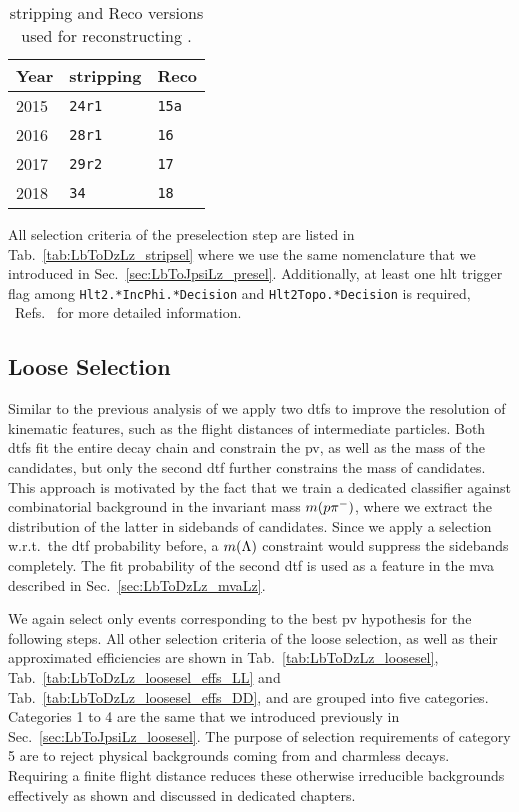\begin{table}[htbp]
    \centering
    \caption{\Gls{stripping} and Reco versions used for reconstructing \decay{\Lb}{\Dz\Lz}.}
    \label{tab:LbToDzLz_vstripping}

    \begin{tabular}{lll}
        \toprule
        Year & \Gls{stripping} & Reco \\
        \midrule
        2015 & \texttt{24r1} & \texttt{15a} \\
        2016 & \texttt{28r1} & \texttt{16} \\
        2017 & \texttt{29r2} & \texttt{17} \\
        2018 & \texttt{34} & \texttt{18} \\
        \bottomrule
    \end{tabular}
\end{table}

All selection criteria of the preselection step are listed in Tab.~\ref{tab:LbToDzLz_stripsel} where we use the same nomenclature that we introduced in Sec.~\ref{sec:LbToJpsiLz_presel}.
Additionally, at least one \gls{hlt} trigger flag among \texttt{Hlt2.*IncPhi.*Decision} and \texttt{Hlt2Topo.*Decision} is required, \cf{}~Refs.~\cite{triggerRun2,HTL2TopoLines} for more detailed information.

\subsection{Loose Selection}
\label{sec:LbToDzLz_loosesel}
Similar to the previous analysis of \decay{\Lb}{\jpsi\Lz} we apply two \glspl{dtf} to improve the resolution of kinematic features, such as the flight distances of intermediate particles.
Both \glspl{dtf} fit the entire decay chain \decay{\Lb}{\Dz\Lz} and constrain the \gls{pv}, as well as the mass of the \Dz candidates, but only the second \gls{dtf} further constrains the mass of \Lz candidates.
This approach is motivated by the fact that we train a dedicated \Lz classifier against combinatorial background in the invariant mass $m({p}{{\pi}^-})$, where we extract the distribution of the latter in sidebands of \Lz candidates.
Since we apply a selection w.r.t.\ the \gls{dtf} probability before, a $m({\Lambda})$ constraint would suppress the sidebands completely.
The fit probability of the second \gls{dtf} is used as a feature in the \gls{mva} described in Sec.~\ref{sec:LbToDzLz_mvaLz}.

We again select only events corresponding to the best \gls{pv} hypothesis for the following steps.
All other selection criteria of the loose selection, as well as their approximated efficiencies are shown in Tab.~\ref{tab:LbToDzLz_loosesel}, Tab.~\ref{tab:LbToDzLz_loosesel_effs_LL} and Tab.~\ref{tab:LbToDzLz_loosesel_effs_DD}, and are grouped into five categories.
Categories 1 to 4 are the same that we introduced previously in Sec.~\ref{sec:LbToJpsiLz_loosesel}.
The purpose of selection requirements of category 5 are to reject physical backgrounds coming from \decay{\Lb}{\Dz\proton\pim} and charmless decays.
Requiring a finite flight distance reduces these otherwise irreducible backgrounds effectively as shown and discussed in dedicated chapters.

